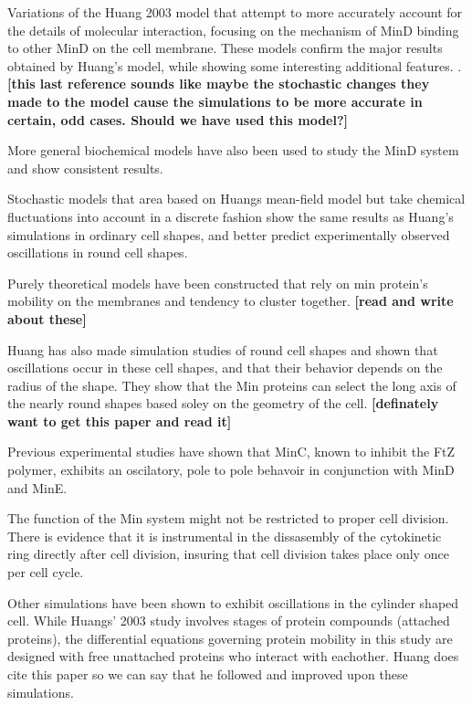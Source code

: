 \documentclass[letterpaper,twocolumn,amsmath,amssymb,pre]{revtex4-1}
\newcommand{\red}[1]{{\bf \color{red} #1}}
\newcommand{\fixme}[1]{\red{[#1]}}
\begin{document}
Variations of the Huang 2003 model that attempt to more accurately
account for the details of molecular interaction, focusing on the
mechanism of MinD binding to other MinD on the cell membrane.  These
models confirm the major results obtained by Huang's model, while
showing some interesting additional features.
.\cite{drew2005polymerization}\cite{fange2006noise}\fixme{this last
  reference sounds like maybe the stochastic changes they made to the
  model cause the simulations to be more accurate in certain, odd
  cases.  Should we have used this model?}

More general biochemical models have also been used to study the MinD
system and show consistent results.\cite{arjunan2010new}

Stochastic models that area based on Huangs mean-field model but take
chemical fluctuations into account in a discrete fashion show the same
results as Huang's simulations in ordinary cell shapes, and better
predict experimentally observed oscillations in round cell
shapes.\cite{fange2006noise}

Purely theoretical models have been constructed that rely on min
protein's mobility on the membranes and tendency to cluster
together.\cite{kruse2002dynamic}\cite{howard2005cellular} \fixme{read
  and write about these}

Huang has also made simulation studies of round cell shapes and shown
that oscillations occur in these cell shapes, and that their behavior
depends on the radius of the shape. They show that the Min proteins can
select the long axis of the nearly round shapes based soley on the
geometry of the cell.\cite{huang2004min} \fixme{definately want to get
  this paper and read it}

Previous experimental studies have shown that MinC, known to inhibit
the FtZ polymer, exhibits an oscilatory, pole to pole behavoir in conjunction with
MinD and MinE. \cite{hu1999topological}

The function of the Min system might not be restricted to proper cell
division.  There is evidence that it is instrumental in the
dissasembly of the cytokinetic ring directly after cell division,
insuring that cell division takes place only once per cell
cycle. \cite{van2010mincdj}

Other simulations have been shown to exhibit oscillations in the
cylinder shaped cell.  While Huangs' 2003 study involves stages of
protein compounds (attached proteins), the differential equations
governing protein mobility in this study are designed with free
unattached proteins who interact with eachother.  Huang does cite this
paper so we can say that he followed and improved upon these
simulations.\cite{meinhardt2001pattern}
\end{document}
